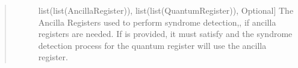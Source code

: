 \documentclass[letterpaper,10pt,english]{sphinxmanual}
\begin{document}
\begin{fulllineitems}
\begin{fulllineitems}
\begin{quote}
\begin{description}
\begin{description}
\item[{}] \leavevmode{[}list(list(AncillaRegister)), list(list(QuantumRegister)), Optional{]}
\sphinxAtStartPar
The Ancilla Registers used to perform syndrome detection,, if ancilla registers are needed. If  is provided, it must satisfy  and the syndrome detection process for the  quantum register will use the  ancilla register.

\end{description}

\end{description}\end{quote}

\end{fulllineitems}


\end{fulllineitems}

\end{document}
